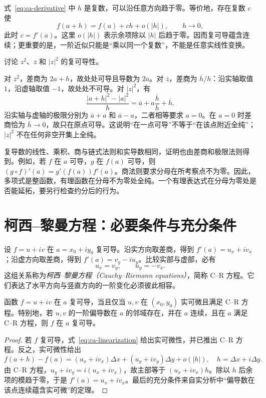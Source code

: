 式~\eqref{eq:ca-derivative} 中 $h$ 是复数，可以沿任意方向趋于零。等价地，存在复数 $c$ 使
\begin{equation}
 f(a+h)=f(a)+ch+o(|h|),\qquad h\to0,
 \label{eq:ca-linearization}
\end{equation}
此时 $c=f'(a)$。这里 $o(|h|)$ 表示余项除以 $|h|$ 后趋于零。因而复可导蕴含连续；更重要的是，一阶近似只能是“乘以同一个复数”，不能是任意实线性变换。

\begin{example}[三个外形简单但性质不同的函数]
讨论 $z^2$、$\overline z$ 和 $|z|^2$ 的复可导性。
\end{example}
\begin{solve}
对 $z^2$，差商为 $2a+h$，故处处可导且导数为 $2a$。对 $\overline z$，差商为 $\overline h/h$：沿实轴取值 $1$，沿虚轴取值 $-1$，故处处不可导。对 $|z|^2$，有
\[
 \frac{|a+h|^2-|a|^2}{h}
 =\overline a+a\frac{\overline h}{h}+\overline h.
\]
沿实轴与虚轴的极限分别为 $\overline a+a$ 和 $\overline a-a$，二者相等要求 $a=0$。在 $a=0$ 时差商恰为 $\overline h\to0$，故只在原点可导。这说明“在一点可导”不等于“在该点附近全纯”；$|z|^2$ 不在任何非空开集上全纯。
\end{solve}

复导数的线性、乘积、商与链式法则和实导数相同，证明也由差商和极限法则得到。例如，若 $f$ 在 $a$ 可导，$g$ 在 $f(a)$ 可导，则 $(g\circ f)'(a)=g'(f(a))f'(a)$。商法则要求分母在所考察点不为零。因此，多项式是整函数，有理函数在分母不为零处全纯。一个有理表达式在分母为零处是否能延拓，要另行检查约分后的行为。

\section{柯西--黎曼方程：必要条件与充分条件}

设 $f=u+iv$ 在 $a=x_0+iy_0$ 复可导。沿实方向取差商，得到 $f'(a)=u_x+iv_x$；沿虚方向取差商，得到 $f'(a)=v_y-iu_y$。比较实部与虚部，必有
\begin{equation}
 u_x=v_y,\qquad u_y=-v_x.
 \label{eq:ca-cr}
\end{equation}
这组关系称为\emph{柯西--黎曼方程（Cauchy--Riemann equations）}，简称 C--R 方程。它们表达了水平方向与竖直方向的一阶变化必须彼此相容。

\begin{theorem}[复可导的实微分判别]
\label{thm:ca-cr}
函数 $f=u+iv$ 在 $a$ 复可导，当且仅当 $u,v$ 在 $(x_0,y_0)$ 实可微且满足 C--R 方程。特别地，若 $u,v$ 的一阶偏导数在 $a$ 的邻域存在，并在 $a$ 连续，且在 $a$ 满足 C--R 方程，则 $f$ 在 $a$ 复可导。
\end{theorem}
\begin{proof}
若 $f$ 复可导，式~\eqref{eq:ca-linearization} 给出实可微性，并已推出 C--R 方程。反之，实可微性给出
\[
 f(a+h)-f(a)
 =(u_x+iv_x)\Delta x+(u_y+iv_y)\Delta y+o(|h|),
 \quad h=\Delta x+i\Delta y.
\]
由 C--R 方程，$u_y+iv_y=i(u_x+iv_x)$，故主部等于 $(u_x+iv_x)h$。除以 $h$ 后余项的模趋于零，于是 $f'(a)=u_x+iv_x$。最后的充分条件来自实分析中“偏导数在该点连续蕴含实可微”的定理。
\end{proof}

